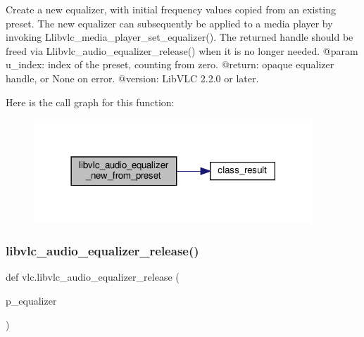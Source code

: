 \begin{DoxyVerb}Create a new equalizer, with initial frequency values copied from an existing
preset.
The new equalizer can subsequently be applied to a media player by invoking
L{libvlc_media_player_set_equalizer}().
The returned handle should be freed via L{libvlc_audio_equalizer_release}() when
it is no longer needed.
@param u_index: index of the preset, counting from zero.
@return: opaque equalizer handle, or None on error.
@version: LibVLC 2.2.0 or later.
\end{DoxyVerb}
 Here is the call graph for this function\+:
\nopagebreak
\begin{figure}[H]
\begin{center}
\leavevmode
\includegraphics[width=297pt]{namespacevlc_aeaf5e53ef0f358b71fc1796b0bc0a114_cgraph}
\end{center}
\end{figure}
\mbox{\label{namespacevlc_ae82eed728fae30f533e3bdaaeeb2fb24}} 
\subsubsection{\texorpdfstring{libvlc\+\_\+audio\+\_\+equalizer\+\_\+release()}{libvlc\_audio\_equalizer\_release()}}
{\footnotesize\ttfamily def vlc.\+libvlc\+\_\+audio\+\_\+equalizer\+\_\+release (\begin{DoxyParamCaption}\item[{}]{p\+\_\+equalizer }\end{DoxyParamCaption})}

